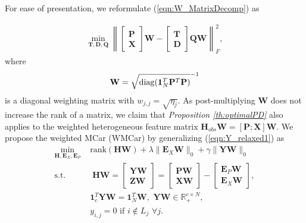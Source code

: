 \documentclass[10pt,journal,compsoc]{IEEEtran}
\begin{document}
For ease of presentation, we reformulate (\ref{eqn:W_MatrixDecomp}) as



\begin{equation}
\begin{aligned}
\min_{\mathbf{T}, \mathbf{D}, \mathbf{Q}} \left\|
\begin{bmatrix}
\mathbf{P} \\
\mathbf{X}
\end{bmatrix} \mathbf{W}
-
\begin{bmatrix}
\mathbf{T} \\
\mathbf{D}
\end{bmatrix} \mathbf{Q} \mathbf{W}
\right\|_F^2
,
\end{aligned}
\end{equation}
where
\begin{equation}
\begin{aligned}
\mathbf{W} = \sqrt{\mathop{\rm diag}\nolimits(\mathbf{1}_N^T \mathbf{P}^T \mathbf{P})}^{-1}
\end{aligned}\label{eqn:W_matrix}
\end{equation}
is a diagonal weighting matrix with $w_{j,j} = \sqrt{\eta_j}$.
As post-multiplying $\mathbf{W}$ does not increase the rank of a matrix, we claim that \emph{Proposition \ref{th:optimalPD}} also applies to the weighted heterogeneous feature matrix $\mathbf{H}_{obs} \mathbf{W} = [\mathbf{P};\mathbf{X}] \mathbf{W}$. We propose the weighted MCar (WMCar) by generalizing (\ref{eqn:Y_relaxed1}) as
\begin{equation}
\begin{aligned}
 \min_{\mathbf{H}, \mathbf{E}_X, \mathbf{E}_P} \,\, & \mathrm{rank} (\mathbf{H}\mathbf{W}) + \lambda \|\mathbf{E}_X \mathbf{W}\|_0  +  \gamma \|\mathbf{Y} \mathbf{W}\|_0\\
 \text{s.t.} & \;
{\mathbf{H}\mathbf{W}}= \begin{bmatrix}
\mathbf{Y} \mathbf{W}\\
\mathbf{Z} \mathbf{W}
\end{bmatrix}= \begin{bmatrix}
\mathbf{P} \mathbf{W} \\
\mathbf{X} \mathbf{W}
\end{bmatrix} - \begin{bmatrix}
\mathbf{E}_P \mathbf{W}\\
\mathbf{E}_X \mathbf{W}
\end{bmatrix},\\
& \mathbf{1}^T_c \mathbf{Y}\mathbf{W} = \mathbf{1}^T_N\mathbf{W}, \,\, \mathbf{Y}\mathbf{W} \in \mathbb{R}_+^{c \times N}, \\
& y_{i,j} = 0 \,\, \mathrm{if}  \,\, i \notin L_j \,\, \forall j. \\
\end{aligned}\label{eqn:Y_relaxed1_W1}
\end{equation}
\end{document}
